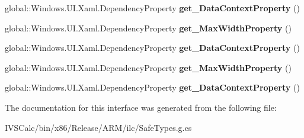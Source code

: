 \begin{DoxyCompactItemize}
\item 
\mbox{\label{interface_windows_1_1_u_i_1_1_xaml_1_1_i_framework_element_statics_afb558b91e7c46ece6685fec26f7cb5be}} 
global\+::\+Windows.\+U\+I.\+Xaml.\+Dependency\+Property {\bfseries get\+\_\+\+Data\+Context\+Property} ()
\item 
\mbox{\label{interface_windows_1_1_u_i_1_1_xaml_1_1_i_framework_element_statics_a39f51f7e53674984060eaa3b0e31e689}} 
global\+::\+Windows.\+U\+I.\+Xaml.\+Dependency\+Property {\bfseries get\+\_\+\+Max\+Width\+Property} ()
\item 
\mbox{\label{interface_windows_1_1_u_i_1_1_xaml_1_1_i_framework_element_statics_afb558b91e7c46ece6685fec26f7cb5be}} 
global\+::\+Windows.\+U\+I.\+Xaml.\+Dependency\+Property {\bfseries get\+\_\+\+Data\+Context\+Property} ()
\item 
\mbox{\label{interface_windows_1_1_u_i_1_1_xaml_1_1_i_framework_element_statics_a39f51f7e53674984060eaa3b0e31e689}} 
global\+::\+Windows.\+U\+I.\+Xaml.\+Dependency\+Property {\bfseries get\+\_\+\+Max\+Width\+Property} ()
\item 
\mbox{\label{interface_windows_1_1_u_i_1_1_xaml_1_1_i_framework_element_statics_afb558b91e7c46ece6685fec26f7cb5be}} 
global\+::\+Windows.\+U\+I.\+Xaml.\+Dependency\+Property {\bfseries get\+\_\+\+Data\+Context\+Property} ()
\end{DoxyCompactItemize}


The documentation for this interface was generated from the following file\+:\begin{DoxyCompactItemize}
\item 
I\+V\+S\+Calc/bin/x86/\+Release/\+A\+R\+M/ilc/Safe\+Types.\+g.\+cs\end{DoxyCompactItemize}
